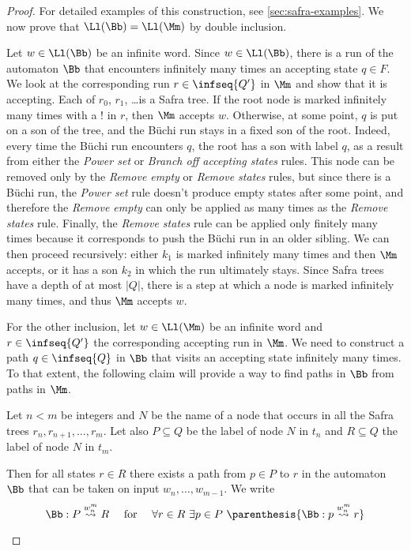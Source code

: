 \begin{proof}
    For detailed examples of this construction, see \autoref{sec:safra-examples}.
    We now prove that $\Ll(\Bb) = \Ll(\Mm)$ by double inclusion.

    Let $w \in \Ll(\Bb)$ be an infinite word.
    Since $w \in \Ll(\Bb)$, there is a run of the automaton $\Bb$
    that encounters infinitely many times an accepting state $q \in F$.
    We look at the corresponding run $r \in \infseq{Q'}$ in $\Mm$ and show that it
    is accepting. Each of $r_0$, $r_1$, \dots is a Safra tree.
    If the root node is marked infinitely many times with a
    $!$ in $r$, then $\Mm$ accepts $w$.
    Otherwise, at some point, $q$ is put on
    a son of the tree, and the Büchi run stays in a fixed
    son of the root.
    Indeed, every time the Büchi run encounters $q$,
    the root has a son with label $q$, as a result from
    either the \textit{Power set} or \textit{Branch off accepting states}
    rules. This node can be removed only by the \textit{Remove empty}
    or \textit{Remove states} rules, but since there is a Büchi run,
    the \textit{Power set} rule doesn't produce empty states after some point,
    and therefore the \textit{Remove empty} can only be applied as many times
    as the \textit{Remove states} rule. Finally, the \textit{Remove states}
    rule can be applied only finitely many times because it corresponds
    to push the Büchi run in an older sibling.
    We can then proceed recursively: either $k_1$ is marked infinitely
    many times and then $\Mm$ accepts, or it has a son $k_2$ in which the run ultimately stays.
    Since Safra trees have a depth of at most $|Q|$, there is a step
    at which a node is marked infinitely many times, and thus $\Mm$ accepts
    $w$.

    For the other inclusion, let $w \in \Ll(\Mm)$ be an infinite word
    and $r \in \infseq{Q'}$ the corresponding accepting run in $\Mm$.
    We need to construct a path
    $q \in \infseq{Q}$ in $\Bb$ that visits
    an accepting state infinitely many times.
    To that extent, the following claim will provide a
    way to find paths in $\Bb$ from paths in $\Mm$.

    \begin{claim}
        Let $n < m$ be integers and $N$ be the name of a node
        that occurs in all the Safra trees $r_n, r_{n+1}, \dots, r_m$.
        Let also $P \subseteq Q$ be the label of node $N$ in $t_n$
        and $R \subseteq Q$ the label of node $N$ in $t_m$.

        Then for all states $r \in R$ there exists
        a path from $p \in P$ to $r$ in the automaton $\Bb$
        that can be taken on input $w_n, \dots, w_{m-1}$.
        We write
        \[
            \Bb : P \pathto{w_n^m} R
            \quad\text{ for }\quad
            \forall r \in R~
            \exists p \in P~
            \parenthesis{
                \Bb : p \pathto{w_n^m} r
            }
        \]


\end{claim}
\end{proof}
